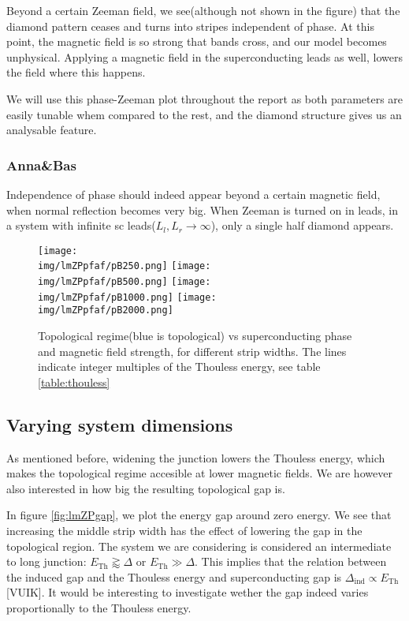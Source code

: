 \documentclass[10pt,a4paper]{article}
\newcommand{\img}{./images}
\begin{document}
		Beyond a certain Zeeman field, we see(although not shown in the figure) that the diamond pattern ceases and turns into stripes independent of phase. At this point, the magnetic field is so strong that bands cross, and our model becomes unphysical. Applying a magnetic field in the superconducting leads as well, lowers the field where this happens.
		
		We will use this phase-Zeeman plot throughout the report as both parameters are easily tunable whem compared to the rest, and the diamond structure gives us an analysable feature.
		
		\subsubsection{Anna\&Bas}
		Independence of phase should indeed appear beyond a certain magnetic field, when normal reflection becomes very big. When Zeeman is turned on in leads, in a system with infinite sc leads($L_l, L_r \rightarrow \infty$), only a single half diamond appears.
		
	\begin{figure}[H]
		\texttt{[image: \\img/lmZPpfaf/pB250.png]}
		\texttt{[image: \\img/lmZPpfaf/pB500.png]}
		\texttt{[image: \\img/lmZPpfaf/pB1000.png]}
		\texttt{[image: \\img/lmZPpfaf/pB2000.png]}
		\caption{Topological regime(blue is topological) vs superconducting phase and magnetic field strength, for different strip widths. The lines indicate integer multiples of the Thouless energy, see table \ref{table:thouless}}
		\label{fig:lmZPpfaf}
	\end{figure}

	\subsection{Varying system dimensions}
	 As mentioned before, widening the junction lowers the Thouless energy, which makes the topological regime accesible at lower magnetic fields. We are however also interested in how big the resulting topological gap is. 
	 
	 In figure \ref{fig:lmZPgap}, we plot the energy gap around zero energy. We see that increasing the middle strip width has the effect of lowering the gap in the topological region. The system we are considering is considered an intermediate to long junction: $E_\text{Th} \gtrapprox \Delta$ or $E_\text{Th} \gg \Delta$. This implies that the relation between the induced gap and the Thouless energy and superconducting gap is $\Delta_\text{ind} \propto E_\text{Th}$[VUIK]. It would be interesting to investigate wether the gap indeed varies proportionally to the Thouless energy.
	 
\end{document}
